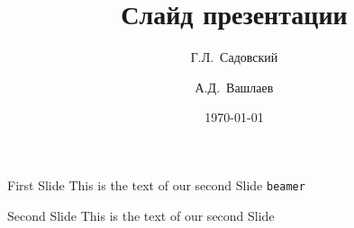 \documentclass[aspectratio=169]{beamer} %
\begin{document}
\title{Слайд презентации}
\subtitle{}
\author[Садовский, Вашлаев]
{Г.Л.~Садовский \and А.Д.~Вашлаев}


\date{\today}
\subject{Дисциплина}


    
\begin{frame}{}
\titlepage
\end{frame}

\begin{frame}[c]{First Slide}
    This is the text of our second Slide \texttt{beamer}
\end{frame}

\begin{frame}{Second Slide}
    This is the text of our second Slide
\end{frame}
\end{document}
